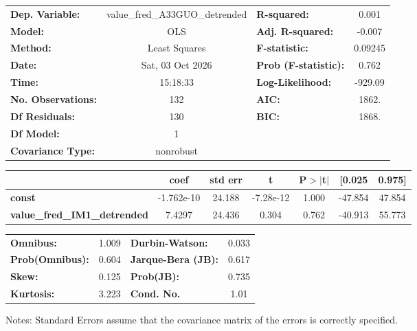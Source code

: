 \begin{center}
\begin{tabular}{lclc}
\toprule
\textbf{Dep. Variable:}              & value\_fred\_A33GUO\_detrended & \textbf{  R-squared:         } &     0.001   \\
\textbf{Model:}                      &              OLS               & \textbf{  Adj. R-squared:    } &    -0.007   \\
\textbf{Method:}                     &         Least Squares          & \textbf{  F-statistic:       } &   0.09245   \\
\textbf{Date:}                       &        Sat, 03 Oct 2026        & \textbf{  Prob (F-statistic):} &    0.762    \\
\textbf{Time:}                       &            15:18:33            & \textbf{  Log-Likelihood:    } &   -929.09   \\
\textbf{No. Observations:}           &                132             & \textbf{  AIC:               } &     1862.   \\
\textbf{Df Residuals:}               &                130             & \textbf{  BIC:               } &     1868.   \\
\textbf{Df Model:}                   &                  1             & \textbf{                     } &             \\
\textbf{Covariance Type:}            &           nonrobust            & \textbf{                     } &             \\
\bottomrule
\end{tabular}
\begin{tabular}{lcccccc}
                                     & \textbf{coef} & \textbf{std err} & \textbf{t} & \textbf{P$> |$t$|$} & \textbf{[0.025} & \textbf{0.975]}  \\
\midrule
\textbf{const}                       &   -1.762e-10  &       24.188     & -7.28e-12  &         1.000        &      -47.854    &       47.854     \\
\textbf{value\_fred\_IM1\_detrended} &       7.4297  &       24.436     &     0.304  &         0.762        &      -40.913    &       55.773     \\
\bottomrule
\end{tabular}
\begin{tabular}{lclc}
\textbf{Omnibus:}       &  1.009 & \textbf{  Durbin-Watson:     } &    0.033  \\
\textbf{Prob(Omnibus):} &  0.604 & \textbf{  Jarque-Bera (JB):  } &    0.617  \\
\textbf{Skew:}          &  0.125 & \textbf{  Prob(JB):          } &    0.735  \\
\textbf{Kurtosis:}      &  3.223 & \textbf{  Cond. No.          } &     1.01  \\
\bottomrule
\end{tabular}
\end{center}

Notes: \newline
 [1] Standard Errors assume that the covariance matrix of the errors is correctly specified.